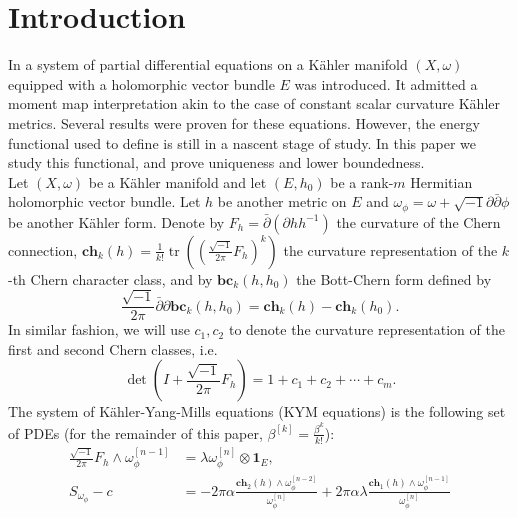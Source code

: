 \documentclass[10pt, letterpaper]{amsart}
\newcommand{\spbp}{\sqrt{-1}\partial \bar{\partial}}
\newcommand{\tr}{\operatorname{tr}}
\newcommand{\dbar}{\bar{\partial}}
\theoremstyle{plain}
\theoremstyle{definition}
\numberwithin{equation}{section}
\begin{document}
\section{Introduction}
\indent In \cite{Garcia1, Garcia2} a system of partial differential equations on a K\"ahler manifold $(X,\omega)$ equipped with a  holomorphic vector bundle $E$ was introduced. It admitted a moment map interpretation akin to the case of constant scalar curvature K\"ahler metrics. Several results were proven for these equations. However, the energy functional used to define is still in a nascent stage of study. In this paper we study this functional, and prove uniqueness and lower boundedness. \\
\indent Let $(X,\omega)$ be a K\"ahler manifold  and let $(E,h_0)$ be a rank-$m$ Hermitian holomorphic vector bundle. Let $h$ be another metric on $E$ and $\omega _{\phi}=\omega+ \spbp \phi$ be another K\"ahler form. Denote by $F_h=\bar\partial \left( \partial h h^{-1}\right)$ the curvature of the Chern connection, $\mathbf{ch}_k(h) =  \frac{1}{k!}\tr \left ( \left ( \frac{\sqrt{-1}}{2\pi}F_h\right ) ^k \right )$ the curvature representation of the $k$-th Chern character class, and by $ \mathbf{bc}_k\left(h,h_0\right)$ the Bott-Chern form \cite{BC} defined by
\[
\frac{\sqrt{-1}}{2\pi} \dbar\partial \mathbf{bc}_k\left(h,h_0\right)  = \mathbf{ch}_k \left(h\right) - \mathbf{ch}_k\left(h_0\right).
\]
 In similar fashion, we will use $c_1, c_2$ to denote the curvature representation of the first and second Chern classes, i.e. 
 \[
 \det \left( I + \frac{\sqrt{-1}}{2\pi}F_{h}\right)
 = 
 1 + c_1+ c_2 +\cdots + c_m.
 \]
 The system of K\"ahler-Yang-Mills equations (KYM equations)  \cite{Garcia1, Garcia2} is the following set of PDEs (for the remainder of this paper, $\beta^{[k]}=\frac{\beta^k}{k!}$):
\begin{equation}
\begin{split}
\frac{\sqrt{-1}}{2\pi}F_{h}\wedge \omega _{\phi} ^{[n-1]} & = \lambda \omega _{\phi} ^{[n]} \otimes \mathbf{1}_E,\\
S_{\omega_{\phi}} - c
& = - 2\pi \alpha  \frac{\mathbf{ch}_2 \left( h\right)\wedge\omega_{\phi}^{[n-2]}}{\omega_{\phi}^{[n]}} + 2\pi \alpha\lambda \frac{\mathbf{ch}_1\left(h\right)\wedge\omega_{\phi}^{[n-1]}}{\omega_{\phi}^{[n]}}
\label{mainsys}
\end{split}
\end{equation}
\end{document}
